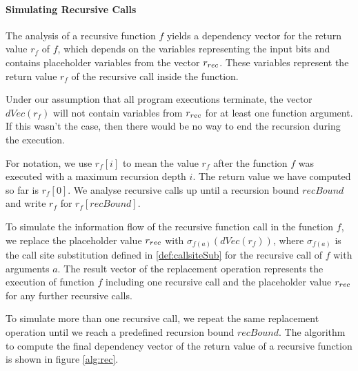 \paragraph{Simulating Recursive Calls}
The analysis of a recursive function $f$ yields a dependency vector for the return value $r_f$ of $f$, which depends on the variables representing the input bits and contains placeholder variables from the vector $r_{rec}$. These variables represent the return value $r_f$ of the recursive call inside the function.

Under our assumption that all program executions terminate, the vector $dVec(r_f)$ will not contain variables from $r_{rec}$ for at least one function argument. If this wasn't the case, then there would be no way to end the recursion during the execution.

For notation, we use $r_f[i]$ to mean the value $r_f$ after the function $f$ was executed with a maximum recursion depth $i$. The return value we have computed so far is $r_f[0]$. We analyse recursive calls up until a recursion bound $recBound$ and write $r_f$ for $r_f[recBound]$.

To simulate the information flow of the recursive function call in the function $f$, we replace the placeholder value $r_{rec}$ with $\sigma_{f(a)}(dVec(r_f))$, where $\sigma_{f(a)}$ is the call site substitution defined in \ref{def:callsiteSub} for the recursive call of $f$ with arguments $a$. The result vector of the replacement operation represents the execution of function $f$ including one recursive call and the placeholder value $r_{rec}$ for any further recursive calls.

To simulate more than one recursive call, we repeat the same replacement operation until we reach a predefined recursion bound $recBound$. The algorithm to compute the final dependency vector of the return value of a recursive function is shown in figure \ref{alg:rec}.

